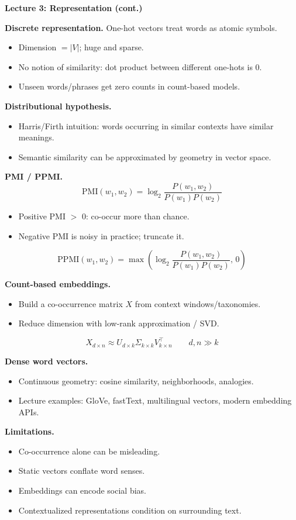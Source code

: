 \documentclass[letterpaper,landscape]{article}
\newcommand{\secbar}[1]{\vspace{1pt}\colorbox{black!12}{\parbox{\linewidth}{\textbf{#1}}}\vspace{1pt}}
\newcommand{\mini}[1]{\textbf{#1}}
\newcommand{\eqline}[1]{\[
\displaystyle #1
\]}
\begin{document}
\begin{minipage}[t]{0.325\textwidth}\vspace{0pt}
\secbar{Lecture 3: Representation (cont.)}
\mini{Discrete representation.} One-hot vectors treat words as atomic symbols.
\begin{itemize}
\item Dimension $=|V|$; huge and sparse.
\item No notion of similarity: dot product between different one-hots is $0$.
\item Unseen words/phrases get zero counts in count-based models.
\end{itemize}

\mini{Distributional hypothesis.}
\begin{itemize}
\item Harris/Firth intuition: words occurring in similar contexts have similar meanings.
\item Semantic similarity can be approximated by geometry in vector space.
\end{itemize}

\mini{PMI / PPMI.}
\eqline{\mathrm{PMI}(w_1,w_2)=\log_2\frac{P(w_1,w_2)}{P(w_1)P(w_2)}}
\begin{itemize}
\item Positive PMI $>$ 0: co-occur more than chance.
\item Negative PMI is noisy in practice; truncate it.
\end{itemize}
\eqline{\mathrm{PPMI}(w_1,w_2)=\max\!\left(\log_2\frac{P(w_1,w_2)}{P(w_1)P(w_2)},\,0\right)}

\mini{Count-based embeddings.}
\begin{itemize}
\item Build a co-occurrence matrix $X$ from context windows/taxonomies.
\item Reduce dimension with low-rank approximation / SVD.
\end{itemize}
\eqline{X_{d\times n}\approx U_{d\times k}\Sigma_{k\times k}V^\top_{k\times n}\qquad d,n\gg k}

\mini{Dense word vectors.}
\begin{itemize}
\item Continuous geometry: cosine similarity, neighborhoods, analogies.
\item Lecture examples: GloVe, fastText, multilingual vectors, modern embedding APIs.
\end{itemize}

\mini{Limitations.}
\begin{itemize}
\item Co-occurrence alone can be misleading.
\item Static vectors conflate word senses.
\item Embeddings can encode social bias.
\item Contextualized representations condition on surrounding text.
\end{itemize}


\end{minipage}
\end{document}
